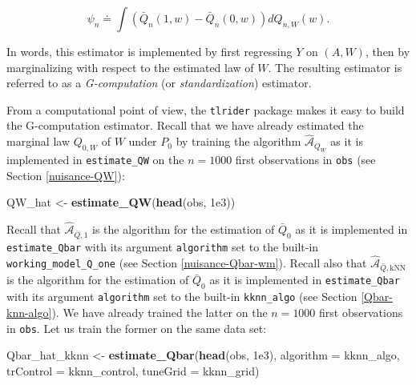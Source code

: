 \documentclass[11pt,openright,twoside]{book}
\newenvironment{Shaded}{\begin{snugshade}}{\end{snugshade}}
\newcommand{\DataTypeTok}[1]{\textcolor[rgb]{0.13,0.29,0.53}{#1}}
\newcommand{\FloatTok}[1]{\textcolor[rgb]{0.00,0.00,0.81}{#1}}
\newcommand{\KeywordTok}[1]{\textcolor[rgb]{0.13,0.29,0.53}{\textbf{#1}}}
\newcommand{\NormalTok}[1]{#1}
\newcommand{\StringTok}[1]{\textcolor[rgb]{0.31,0.60,0.02}{#1}}
\newcommand{\Algo}{\widehat{\mathcal{A}}}
\newcommand{\defq}{\doteq}
\newcommand{\Qbar}{\bar{Q}}
\theoremstyle{definition}
\theoremstyle{definition}
\theoremstyle{definition}
\theoremstyle{remark}
\begin{document}
\begin{equation} 
\psi_{n}   \defq   \int   \left(\Qbar_{n}(1,   w)   -   \Qbar_{n}(0,w)\right)
dQ_{n,W}(w). \label{eq:Gcomp-estimator}
\end{equation}

In words, this estimator is implemented by first regressing \(Y\) on \((A,W)\),
then by marginalizing with respect to the estimated law of \(W\). The resulting
estimator is referred to as a \emph{G-computation} (or \emph{standardization})
estimator.

From a computational point of view, the \texttt{tlrider} package makes it easy to
build the G-computation estimator. Recall that we have already estimated the
marginal law \(Q_{0,W}\) of \(W\) under \(P_{0}\) by training the algorithm
\(\Algo_{Q_{W}}\) as it is implemented in \texttt{estimate\_QW} on the \(n = 1000\) first
observations in \texttt{obs} (see Section \ref{nuisance-QW}):

\begin{Shaded}
\begin{Highlighting}[]
\NormalTok{QW_hat <-}\StringTok{ }\KeywordTok{estimate_QW}\NormalTok{(}\KeywordTok{head}\NormalTok{(obs, }\FloatTok{1e3}\NormalTok{))}
\end{Highlighting}
\end{Shaded}

Recall that \(\Algo_{\Qbar,1}\) is the algorithm for the estimation of
\(\Qbar_{0}\) as it is implemented in \texttt{estimate\_Qbar} with its argument
\texttt{algorithm} set to the built-in \texttt{working\_model\_Q\_one} (see Section
\ref{nuisance-Qbar-wm}). Recall also that \(\Algo_{\Qbar,\text{kNN}}\) is the
algorithm for the estimation of \(\Qbar_{0}\) as it is implemented in
\texttt{estimate\_Qbar} with its argument \texttt{algorithm} set to the built-in \texttt{kknn\_algo}
(see Section \ref{Qbar-knn-algo}). We have already trained the latter on the
\(n=1000\) first observations in \texttt{obs}. Let us train the former on the same data
set:

\begin{Shaded}
\begin{Highlighting}[]
\NormalTok{Qbar_hat_kknn <-}\StringTok{ }\KeywordTok{estimate_Qbar}\NormalTok{(}\KeywordTok{head}\NormalTok{(obs, }\FloatTok{1e3}\NormalTok{),}
                               \DataTypeTok{algorithm =}\NormalTok{ kknn_algo,}
                               \DataTypeTok{trControl =}\NormalTok{ kknn_control,}
                               \DataTypeTok{tuneGrid =}\NormalTok{ kknn_grid)}
\end{Highlighting}
\end{Shaded}
\end{document}
